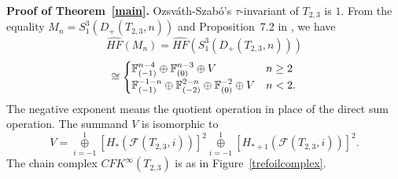 \documentclass[11pt]{amsart}
\begin{document}
{\bf Proof of Theorem~\ref{main}.}
Ozsv\'ath-Szab\'o's $\tau$-invariant of $T_{2,3}$ is $1$.
From the equality $M_n=S^3_1(D_+(T_{2,3},n))$ and Proposition~7.2 in \cite{H}, we have
$$\widehat{HF}(M_n)=\widehat{HF}(S^3_1(D_+(T_{2,3},n)))$$
$$\cong\begin{cases}{\Bbb F}_{(-1)}^{n-4}\oplus {\Bbb F}_{(0)}^{n-3}\oplus V&n\ge 2\\
{\Bbb F}_{(-1)}^{-1-n}\oplus {\Bbb F}_{(-2)}^{2-n}\oplus {\Bbb F}_{(0)}^{-2}\oplus V&n< 2.\end{cases}$$
The negative exponent means the quotient operation in place of the direct sum operation.
The summand $V$ is isomorphic to 
$$V=\overset{1}{\underset{i=-1}{\oplus}}[H_{\ast}({\mathcal F}(T_{2,3},i))]^2\overset{1}{\underset{i=-1}{\oplus}}[H_{\ast+1}({\mathcal F}(T_{2,3},i))]^2.$$
The chain complex $CFK^\infty(T_{2,3})$ is as in {\sc Figure}~\ref{trefoilcomplex}.
\end{document}
